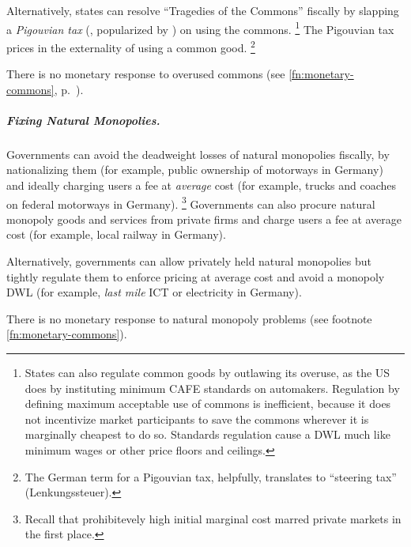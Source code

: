 Alternatively, states can resolve ``Tragedies of the Commons'' \citep{Hardin-1968-aa} fiscally by slapping a \emph{Pigouvian tax} (\citealt{Pigou1912}, popularized by \citealt{Baumol1972}) on using the commons.
\footnote{
	States can also regulate common goods by outlawing its overuse, as the US does by instituting minimum \gls{CAFE} standards on automakers.
	Regulation by defining maximum acceptable use of commons is inefficient, because it does not incentivize market participants to save the commons wherever it is marginally cheapest to do so.
	Standards regulation cause a \gls{DWL} much like minimum wages or other price floors and ceilings.
}
The Pigouvian tax prices in the externality of using a common good.
\footnote{
	The German term for a Pigouvian tax, helpfully, translates to ``steering tax'' (Lenkungssteuer).
}

There is no monetary response to overused commons (see \autoref{fn:monetary-commons}, p.~\pageref{fn:monetary-commons}).

\subparagraph{Fixing Natural Monopolies.}
	\label{sec:natural-monopoly-response}
Governments can avoid the deadweight losses of natural monopolies fiscally, by nationalizing them (for example, public ownership of motorways in Germany) and ideally charging users a fee at \emph{average} cost (for example, trucks and coaches on federal motorways in Germany).
\footnote{
	\label{fn:why-ac-fees}
	Recall that prohibitevely high initial marginal cost marred private markets in the first place.
}
Governments can also procure natural monopoly goods and services from private firms and charge users a fee at average cost (for example, local railway in Germany).


Alternatively, governments can allow privately held natural monopolies but tightly regulate them to enforce pricing at average cost and avoid a monopoly \gls{DWL} (for example, \emph{last mile} \gls{ICT} or electricity in Germany).

There is no monetary response to natural monopoly problems (see footnote \ref{fn:monetary-commons}).


